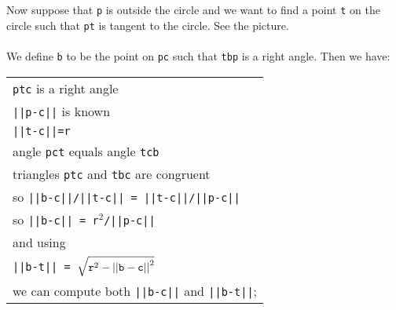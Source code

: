 \documentclass[12pt]{article}
\begin{document}
\begin{minipage}{\textwidth}\raggedright
\label{TANGENT-PICTURE}
\begin{wrapfigure}{r}{0.3\textwidth}
\end{wrapfigure}
Now suppose that {\tt p} is outside the circle and we want to find
a point {\tt t} on the circle such that {\tt pt} is tangent to the
circle.  See the picture. \\
~ \\
\label{FINDING-TANGENT-POINT}
We define {\tt b} to be the point on {\tt pc} such that
{\tt tbp} is a right angle.  Then we have: \\
\hspace*{0.2in}\begin{tabular}{@{}l} \\
    {\tt ptc} is a right angle \\
    {\tt ||p-c||} is known \\
    {\tt ||t-c||=r} \\
    angle {\tt pct} equals angle {\tt tcb} \\
    triangles {\tt ptc} and {\tt tbc} are congruent \\
    so {\tt \small ||b-c||/||t-c|| = ||t-c||/||p-c||} \\
    so {\tt \small ||b-c|| = r$^2$/||p-c||} \\
    and using \\
    {\tt ||b-t|| = $\sqrt{{\tt r}^2 - {\tt ||b-c||}^2}$} \\
    we can compute both {\tt ||b-c||} and {\tt ||b-t||}; \\
    \end{tabular}
\end{minipage} \\
\end{document}
